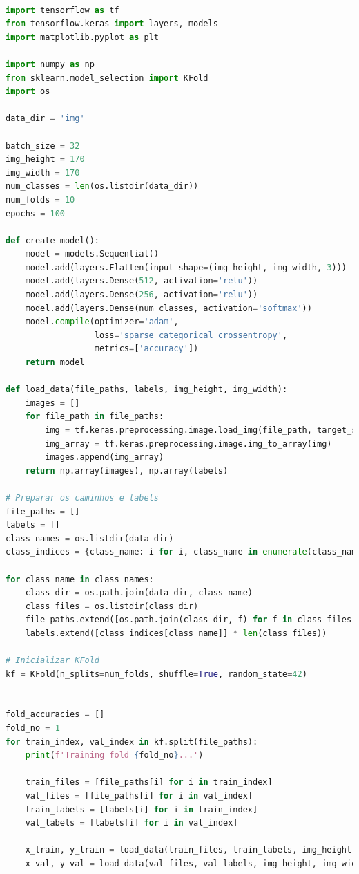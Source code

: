 \documentclass[
  a4paper,%
  12pt,%
  english,%
  brazilian,%
]{article}
\begin{document}
\begin{lstlisting}[language=Python, caption={Treinamento do modelo de aprendizagem profunda}]

import tensorflow as tf
from tensorflow.keras import layers, models
import matplotlib.pyplot as plt

import numpy as np
from sklearn.model_selection import KFold
import os

data_dir = 'img'

batch_size = 32
img_height = 170
img_width = 170
num_classes = len(os.listdir(data_dir))
num_folds = 10
epochs = 100

def create_model():
    model = models.Sequential()
    model.add(layers.Flatten(input_shape=(img_height, img_width, 3)))
    model.add(layers.Dense(512, activation='relu'))
    model.add(layers.Dense(256, activation='relu'))
    model.add(layers.Dense(num_classes, activation='softmax'))
    model.compile(optimizer='adam',
                  loss='sparse_categorical_crossentropy',
                  metrics=['accuracy'])
    return model

def load_data(file_paths, labels, img_height, img_width):
    images = []
    for file_path in file_paths:
        img = tf.keras.preprocessing.image.load_img(file_path, target_size=(img_height, img_width))
        img_array = tf.keras.preprocessing.image.img_to_array(img)
        images.append(img_array)
    return np.array(images), np.array(labels)

# Preparar os caminhos e labels
file_paths = []
labels = []
class_names = os.listdir(data_dir)
class_indices = {class_name: i for i, class_name in enumerate(class_names)}

for class_name in class_names:
    class_dir = os.path.join(data_dir, class_name)
    class_files = os.listdir(class_dir)
    file_paths.extend([os.path.join(class_dir, f) for f in class_files])
    labels.extend([class_indices[class_name]] * len(class_files))

# Inicializar KFold
kf = KFold(n_splits=num_folds, shuffle=True, random_state=42)


fold_accuracies = []
fold_no = 1
for train_index, val_index in kf.split(file_paths):
    print(f'Training fold {fold_no}...')
    
    train_files = [file_paths[i] for i in train_index]
    val_files = [file_paths[i] for i in val_index]
    train_labels = [labels[i] for i in train_index]
    val_labels = [labels[i] for i in val_index]
    
    x_train, y_train = load_data(train_files, train_labels, img_height, img_width)
    x_val, y_val = load_data(val_files, val_labels, img_height, img_width)
    

\end{lstlisting}
\end{document}
